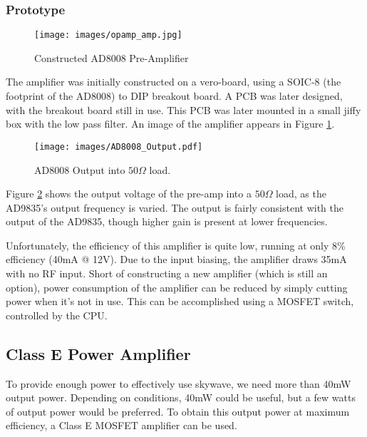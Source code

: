 \documentclass[a4paper,12pt]{article}
\begin{document}
\subsubsection*{Prototype}
\begin{figure}[h]
  \begin{center}
    \texttt{[image: images/opamp\_amp.jpg]}
  \end{center}
  \caption{Constructed AD8008 Pre-Amplifier}
  \label{fig:ad8008}
\end{figure}

The amplifier was initially constructed on a vero-board, using a SOIC-8 (the footprint of the AD8008) to DIP breakout board. A PCB was later designed, with the breakout board still in use. This PCB was later mounted in a small jiffy box with the low pass filter. An image of the amplifier appears in Figure \ref{fig:ad8008}.

\begin{figure}[h]
  \begin{center}
    \texttt{[image: images/AD8008\_Output.pdf]}
  \end{center}
  \caption{AD8008 Output into $50\Omega$ load.}
  \label{fig:ad8008_output}
\end{figure}

Figure \ref{fig:ad8008_output} shows the output voltage of the pre-amp into a $50\Omega$ load, as the AD9835's output frequency is varied. The output is fairly consistent with the output of the AD9835, though higher gain is present at lower frequencies. 

Unfortunately, the efficiency of this amplifier is quite low, running at only 8\% efficiency (40mA @ 12V). Due to the input biasing, the amplifier draws 35mA with no RF input. Short of constructing a new amplifier (which is still an option), power consumption of the amplifier can be reduced by simply cutting power when it's not in use. This can be accomplished using a MOSFET switch, controlled by the CPU. 

\subsection{Class E Power Amplifier}
To provide enough power to effectively use skywave, we need more than 40mW output power. Depending on conditions, 40mW could be useful, but a few watts of output power would be preferred. To obtain this output power at maximum efficiency, a Class E MOSFET amplifier can be used.
\end{document}
